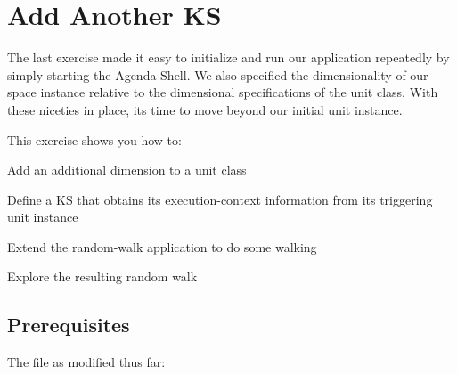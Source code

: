 \documentclass[10pt,twoside,english,pdftex]{article}
\begin{document}

\T\markright{}%
\T\pagestyle{plain}
\T\cleardoublepage
\W{}
\T\pagestyle{fancy}
\T\thispagestyle{fancybottom}
\T\renewcommand{\headrulewidth}{0pt}
\section{Add Another KS}
\label{sec:another-ks}%

The last exercise made it easy to initialize and run our application
repeatedly by simply starting the Agenda Shell.  We also specified the
dimensionality of our  space instance relative to the
dimensional specifications of the  unit class.  With these
niceties in place, its time to move beyond our initial  unit
instance.

\fndocrule

This exercise shows you how to:
\begin{tightitemize}
\item Add an additional dimension to a unit class
\item Define a KS that obtains its execution-context information from its
  triggering unit instance
\item Extend the random-walk application to do some walking
\item Explore the resulting random walk
\end{tightitemize}

\fndocrule

\subsection*{Prerequisites}

\begin{tightitemize}
\item The  file as modified thus far:
\end{tightitemize}
\end{document}

